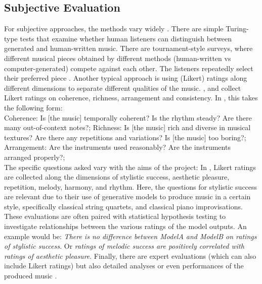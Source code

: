\subsection{Subjective Evaluation}
For subjective approaches, the methods vary widely \cite{Xiong_Wang_ai_eval_methods_2023}. There are simple Turing-type tests that examine whether human listeners can distinguish between generated and human-written music. There are tournament-style surveys, where different musical pieces obtained by different methods (human-written vs computer-generated) compete against each other. The listeners repeatedly select their preferred piece \cite{Huang_Vaswani_Uszkoreit_Shazeer_Simon_Hawthorne_Dai_Hoffman_Dinculescu_Eck_2018}\cite{Rütte_figaro_2023}.
Another typical approach is using (Likert) ratings along different dimensions to separate different qualities of the music. \cite{Dong_Chen_MMT_Kirkpatrick_2023}, \cite{Yu_Lu_Wang_Hu_Tan_Ye_Zhang_museformer_2022} and \cite{Chen_Smith_Spijkervet_Wang_Zou_Li_Kong_Du_2024} collect Likert ratings on coherence, richness, arrangement and consistency. In \cite{Dong_Chen_MMT_Kirkpatrick_2023}, this takes the following form: \\
Coherence: Is [the music] temporally coherent? Is the rhythm steady? Are there many out-of-context notes?;
Richness: Is [the music] rich and diverse in musical textures? Are there any repetitions and variations? Is [the music] too boring?; 
Arrangement: Are the instruments used reasonably? Are the instruments arranged properly?; \\
The specific questions asked vary with the aims of the project: 
In \cite{Yin_Reuben_Stepney_Collins_2023}, Likert ratings are collected along the dimensions of stylistic success, aesthetic pleasure, repetition, melody, harmony, and rhythm. Here, the questions for stylistic success are relevant due to their use of generative models to produce music in a certain style, specifically classical string quartets, and classical piano improvisations. 
These evaluations are often paired with statistical hypothesis testing to investigate relationships between the various ratings of the model outputs. An example would be: \textit{There is no difference between ModelA and ModelB on ratings of stylistic success}. Or \textit{ratings of melodic success are positively correlated with ratings of aesthetic pleasure}.
Finally, there are expert evaluations (which can also include Likert ratings) but also detailed analyses or even performances of the produced music \cite{Sturm_Ben-Tal_2016} \cite{Yin_Reuben_Stepney_Collins_2023}. \\

